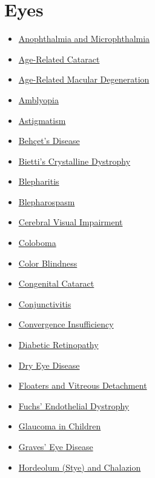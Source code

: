 \section*{Eyes}
\label{sec:organ_eyes}
\begin{itemize}[noitemsep]
  \item \hyperlink{sec:Anophthalmia and Microphthalmia}{Anophthalmia and Microphthalmia}
  \item \hyperlink{sec:Age-Related Cataract}{Age-Related Cataract}
  \item \hyperlink{sec:Age-Related Macular Degeneration}{Age-Related Macular Degeneration}
  \item \hyperlink{sec:Amblyopia}{Amblyopia}
  \item \hyperlink{sec:Astigmatism}{Astigmatism}
  \item \hyperlink{sec:Behçet's Disease}{Behçet's Disease}
  \item \hyperlink{sec:Bietti's Crystalline Dystrophy}{Bietti's Crystalline Dystrophy}
  \item \hyperlink{sec:Blepharitis}{Blepharitis}
  \item \hyperlink{sec:Blepharospasm}{Blepharospasm}
  \item \hyperlink{sec:Cerebral Visual Impairment}{Cerebral Visual Impairment}
  \item \hyperlink{sec:Coloboma}{Coloboma}
  \item \hyperlink{sec:Color Blindness}{Color Blindness}
  \item \hyperlink{sec:Congenital Cataract}{Congenital Cataract}
  \item \hyperlink{sec:Conjunctivitis}{Conjunctivitis}
  \item \hyperlink{sec:Convergence Insufficiency}{Convergence Insufficiency}
  \item \hyperlink{sec:Diabetic Retinopathy}{Diabetic Retinopathy}
  \item \hyperlink{sec:Dry Eye Disease}{Dry Eye Disease}
  \item \hyperlink{sec:Floaters and Vitreous Detachment}{Floaters and Vitreous Detachment}
  \item \hyperlink{sec:Fuchs' Endothelial Dystrophy}{Fuchs' Endothelial Dystrophy}
  \item \hyperlink{sec:Glaucoma in Children}{Glaucoma in Children}
  \item \hyperlink{sec:Graves' Eye Disease}{Graves' Eye Disease}
  \item \hyperlink{sec:Hordeolum (Stye) and Chalazion}{Hordeolum (Stye) and Chalazion}

\end{itemize}
